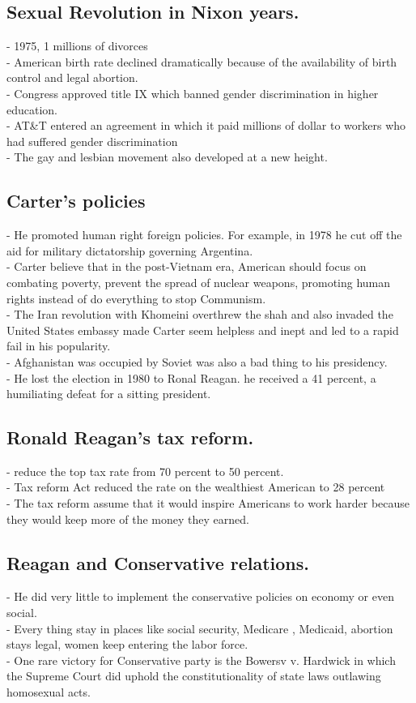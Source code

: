 \documentclass{article}
\begin{document}
\subsection{Sexual Revolution in Nixon years.}
- 1975, 1 millions of divorces \\
- American birth rate declined dramatically because of the availability of birth control and legal abortion.\\
- Congress approved title IX which banned gender discrimination in higher education.\\
- AT\&T entered an agreement in which it paid millions of dollar to workers who had suffered gender discrimination\\
- The gay and lesbian movement also developed at a new height.

\subsection{Carter's policies}
- He promoted human right foreign policies. For example, in 1978 he cut off the aid for military dictatorship governing Argentina.\\
- Carter believe that in the post-Vietnam era, American should focus on combating poverty, prevent the spread of nuclear weapons, promoting human rights instead of do everything to stop Communism.\\
- The Iran revolution with Khomeini overthrew the shah and also invaded the United States embassy made Carter seem helpless and inept and led to a rapid fail in his popularity.\\
- Afghanistan was occupied by Soviet was also a bad thing to his presidency.\\
- He lost the election in 1980 to Ronal Reagan. he received a 41 percent, a humiliating defeat for a sitting president.

\subsection{Ronald Reagan's tax reform.}
-  reduce the top tax rate from 70 percent to 50 percent.\\
- Tax reform Act reduced the rate on the wealthiest American to 28 percent\\
- The tax reform assume that it would inspire Americans to work harder because they would keep more of the money they earned.


\subsection{Reagan and Conservative relations.}
- He did very little to implement the conservative policies on economy or even social. \\
- Every thing stay in places like social security, Medicare , Medicaid, abortion stays legal, women keep entering the labor force.\\
- One rare victory for Conservative party is the Bowersv v. Hardwick in which the Supreme Court did uphold the constitutionality of state laws outlawing homosexual acts.
\end{document}
